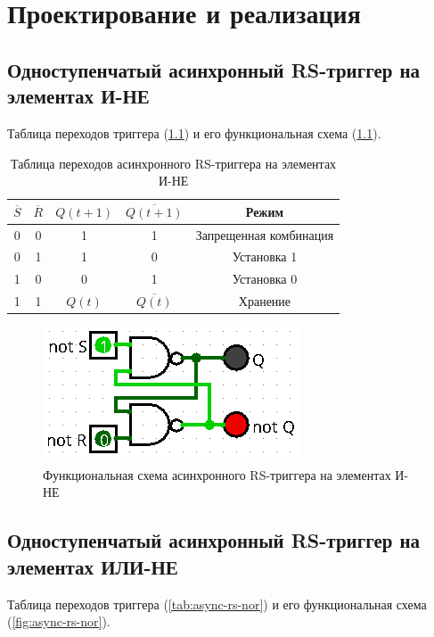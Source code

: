 \documentclass[14pt, a4paper]{extreport}
\begin{document}
\chapter{Проектирование и реализация}
\section{Одноступенчатый асинхронный RS-триггер на элементах И-НЕ}
Таблица переходов триггера (\cref{tab:async-rs-nand}) и его функциональная схема (\cref{fig:async-rs-nand}).

\begin{table}[H]
	\caption{Таблица переходов асинхронного RS-триггера на элементах И-НЕ}
	\label{tab:async-rs-nand}
	\begin{tabular}{|c|c|c|c|c|}
		\hline
		$\overline{S}$ & $\overline{R}$ & $Q(t + 1)$ & $\overline{Q(t + 1)}$ & Режим \\
		\hline
		0 & 0 & 1 & 1 & Запрещенная комбинация \\
		\hline
		0 & 1 & 1 & 0 & Установка 1 \\
		\hline
		1 & 0 & 0 & 1 & Установка 0 \\
		\hline
		1 & 1 & $Q(t)$ & $\overline{Q(t)}$ & Хранение \\
		\hline
	\end{tabular}
\end{table}

\begin{figure}[H]
	\caption{Функциональная схема асинхронного RS-триггера на элементах И-НЕ}
	\label{fig:async-rs-nand}
	\includegraphics[width=\textwidth]{async-rs-nand}
\end{figure}

\section{Одноступенчатый асинхронный RS-триггер на элементах ИЛИ-НЕ}
Таблица переходов триггера (\cref{tab:async-rs-nor}) и его функциональная схема (\cref{fig:async-rs-nor}).
\end{document}

